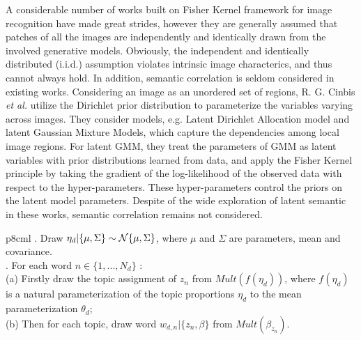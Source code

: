 \documentclass[journal]{IEEEtran}
\begin{document}
A considerable number of works built on Fisher Kernel framework for image recognition have made great strides, however they are generally assumed that patches of all the images are independently and identically drawn from the involved generative models. Obviously, the independent and identically distributed (i.i.d.) assumption violates intrinsic image characterics, and thus cannot always hold. In addition, semantic correlation is seldom considered in existing works. Considering an image as an unordered set of regions, R. G. Cinbis \emph{et al.} \cite{cinbis2012image, cinbis2015approximate} utilize the Dirichlet prior distribution to parameterize the variables varying across images. They consider models, e.g. Latent Dirichlet Allocation model and latent Gaussian Mixture Models, which capture the dependencies among local image regions. For latent GMM, they treat the parameters of GMM as latent variables with prior distributions learned from data, and apply the Fisher Kernel principle by taking the gradient of the log-likelihood of the observed data with respect to the hyper-parameters. These hyper-parameters control the priors on the latent model parameters. Despite of the wide exploration of latent semantic in these works, semantic correlation remains not considered.
\begin{table}[tbp]
    \centering
    \caption{The Generating Process of Image $d$.}
    \label{Table:table_ctm}
    \begin{tabular}{p{8cm}{l}}
        . Draw ${\eta _d}|\{ \mu ,\Sigma \} \sim {\cal N}\{ \mu ,\Sigma \}$, where $\mu$ and $\Sigma$ are parameters, mean and covariance.\\
        . For each word $n \in \{ 1,...,{N_d}\}$ :\\
            \setlength{\hangindent}{2em}\setlength{\parindent}{2em} (a) Firstly draw the topic assignment of ${z_n}$ from $Mult(f({\eta _d}))$, where $f({\eta _d})$ is a natural parameterization of the topic proportions ${\eta _d}$ to the mean parameterization ${\theta _d}$; \\
        \setlength{\parindent}{2em}\setlength{\parindent}{2em} (b) Then for each topic, draw word ${w_{d,n}}|\{ {z_n},\beta \}$ from $Mult({\beta _{{z_n}}})$.\\
        \bottomrule
    \end{tabular}
\end{table}
\end{document}
